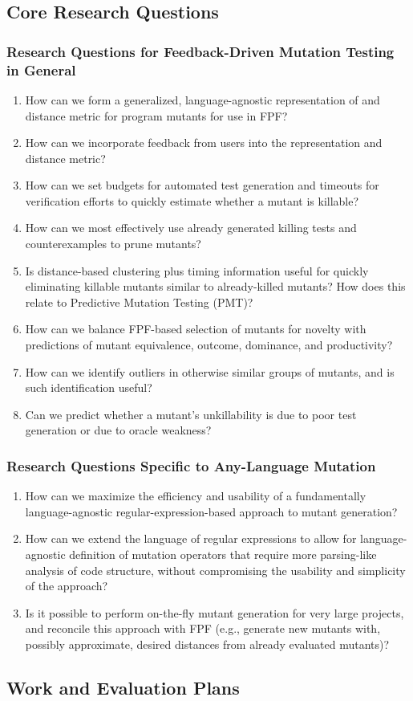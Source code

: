 \subsection{Core Research Questions}

\subsubsection{Research Questions for Feedback-Driven Mutation Testing
in General}

\begin{enumerate}
\item How can we form a generalized, language-agnostic representation
  of and distance metric for program mutants for use in FPF?
\item How can we incorporate feedback from users into the
  representation and distance metric?
\item How can we set budgets for automated test generation and
  timeouts for verification efforts to quickly estimate whether a
  mutant is killable?
\item How can we most effectively use already generated killing tests
  and counterexamples to prune mutants?
\item Is distance-based clustering plus timing information useful for quickly
  eliminating killable mutants similar to already-killed mutants?  How
  does this relate to Predictive Mutation Testing (PMT)?
\item How can we balance FPF-based selection of mutants for novelty
  with predictions of mutant equivalence, outcome, dominance, and
  productivity?
\item How can we identify outliers in otherwise similar groups of
  mutants, and is such identification useful?
\item Can we predict whether a mutant's unkillability is due to poor test
  generation  or due to oracle weakness?
\end{enumerate}

\subsubsection{Research Questions Specific to Any-Language Mutation}

\begin{enumerate}
\item How can we maximize the efficiency and usability of a
  fundamentally language-agnostic regular-expression-based approach to
  mutant generation?
\item How can we extend the language of regular expressions to allow
  for language-agnostic definition of mutation operators that require
  more parsing-like analysis of code structure, without compromising
  the usability and simplicity of the approach?
\item Is it possible to perform on-the-fly mutant generation for very
  large projects, and reconcile this approach with FPF (e.g., generate
  new mutants with, possibly approximate, desired distances from
  already evaluated mutants)?
\end{enumerate}

\subsection{Work and Evaluation Plans}
\label{sec:workplan}

